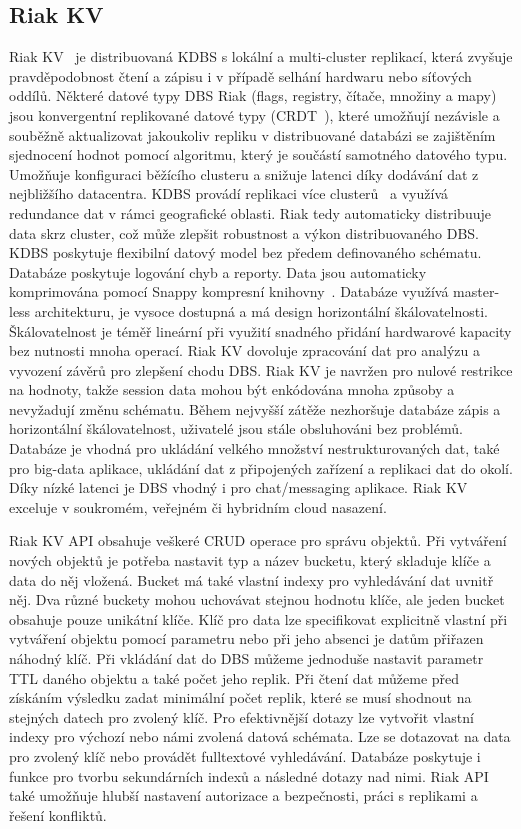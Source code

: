 \documentclass[czech,master,dept460,male,csharp,cpdeclaration]{diploma}
\begin{document}
	\subsection{Riak KV} \label{lab-riak}
	
	Riak KV~\cite{riak} je distribuovaná KDBS s lokální a multi-cluster replikací, která zvyšuje pravděpodobnost čtení a zápisu i v případě selhání hardwaru nebo síťových oddílů. Některé datové typy DBS Riak (flags, registry, čítače, množiny a mapy) jsou konvergentní replikované datové typy (CRDT~\cite{crdt, riakkv-crdt}), které umožňují nezávisle a souběžně aktualizovat jakoukoliv repliku v distribuované databázi se zajištěním sjednocení hodnot pomocí algoritmu, který je součástí samotného datového typu. Umožňuje konfiguraci běžícího clusteru a snižuje latenci díky dodávání dat z nejbližšího datacentra. KDBS provádí replikaci více clusterů~\cite{multicluster, riakkv-multiclustr} a využívá redundance dat v rámci geografické oblasti. Riak tedy automaticky distribuuje data skrz cluster, což může zlepšit robustnost a výkon distribuovaného DBS. KDBS poskytuje flexibilní datový model bez předem definovaného schématu. Databáze poskytuje logování chyb a reporty. Data jsou automaticky komprimována pomocí Snappy kompresní knihovny~\cite{snappy}. Databáze využívá master-less architekturu, je vysoce dostupná a má design horizontální škálovatelnosti. Škálovatelnost je téměř lineární při využití snadného přidání hardwarové kapacity bez nutnosti mnoha operací. Riak KV dovoluje zpracování dat pro analýzu a vyvození závěrů pro zlepšení chodu DBS. Riak KV je navržen pro nulové restrikce na hodnoty, takže session data mohou být enkódována mnoha způsoby a nevyžadují změnu schématu. Během nejvyšší zátěže nezhoršuje databáze zápis a horizontální škálovatelnost, uživatelé jsou stále obsluhováni bez problémů. Databáze je vhodná pro ukládání velkého množství nestrukturovaných dat, také pro big-data aplikace, ukládání dat z připojených zařízení a replikaci dat do okolí. Díky nízké latenci je DBS vhodný i pro chat/messaging aplikace. Riak KV exceluje v soukromém, veřejném či hybridním cloud nasazení.
	
	Riak KV API obsahuje veškeré CRUD operace pro správu objektů. Při vytváření nových objektů je potřeba nastavit typ a název bucketu, který skladuje klíče a data do něj vložená. Bucket má také vlastní indexy pro vyhledávání dat uvnitř něj. Dva různé buckety mohou uchovávat stejnou hodnotu klíče, ale jeden bucket obsahuje pouze unikátní klíče. Klíč pro data lze specifikovat explicitně vlastní při vytváření objektu pomocí parametru nebo při jeho absenci je datům přiřazen náhodný klíč. Při vkládání dat do DBS můžeme jednoduše nastavit parametr TTL daného objektu a také počet jeho replik. Při čtení dat můžeme před získáním výsledku zadat minimální počet replik, které se musí shodnout na stejných datech pro zvolený klíč. Pro efektivnější dotazy lze vytvořit vlastní indexy pro výchozí nebo námi zvolená datová schémata. Lze se dotazovat na data pro zvolený klíč nebo provádět fulltextové vyhledávání. Databáze poskytuje i funkce pro tvorbu sekundárních indexů a následné dotazy nad nimi. Riak API také umožňuje hlubší nastavení autorizace a bezpečnosti, práci s replikami a řešení konfliktů.
	
\end{document}
